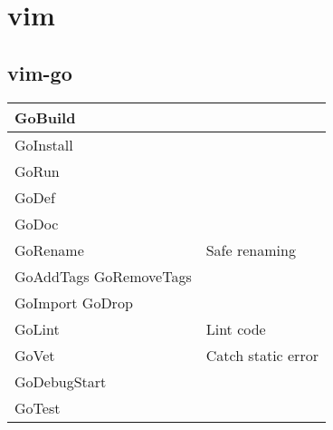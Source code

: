 \section{vim}

\subsection{vim-go}

\begin{tabular}{@{}l|l@{}}
    \hline
    {GoBuild}         & {} \\
    \hline
    {GoInstall}       & {} \\
    \hline
    {GoRun}           & {} \\
    \hline
    {GoDef}           & {} \\
    \hline
    {GoDoc}           & {} \\
    \hline
    {GoRename}        & {Safe renaming} \\
    \hline
    {GoAddTags GoRemoveTags}      & {} \\
    \hline
    {GoImport GoDrop} & {} \\
    \hline
    {GoLint} & {Lint code} \\
    \hline
    {GoVet} & {Catch static error} \\
    \hline
    {GoDebugStart}    & {} \\
    \hline
    {GoTest}          & {} \\
    \hline
\end{tabular}


